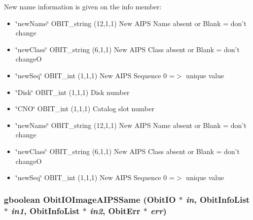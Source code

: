 New name information is given on the info member: \begin{itemize}
\item \char`\"{}new\-Name\char`\"{} OBIT\_\-string (12,1,1) New AIPS Name absent or Blank = don't change \item \char`\"{}new\-Class\char`\"{} OBIT\_\-string (6,1,1) New AIPS Class absent or Blank = don't change\-O \item \char`\"{}new\-Seq\char`\"{} OBIT\_\-int (1,1,1) New AIPS Sequence 0 =$>$ unique value 
\item \char`\"{}Disk\char`\"{} OBIT\_\-int (1,1,1) Disk number \item \char`\"{}CNO\char`\"{} OBIT\_\-int (1,1,1) Catalog slot number \item \char`\"{}new\-Name\char`\"{} OBIT\_\-string (12,1,1) New AIPS Name absent or Blank = don't change \item \char`\"{}new\-Class\char`\"{} OBIT\_\-string (6,1,1) New AIPS Class absent or Blank = don't change\-O \item \char`\"{}new\-Seq\char`\"{} OBIT\_\-int (1,1,1) New AIPS Sequence 0 =$>$ unique value 
\end{itemize}
\subsubsection{\setlength{\rightskip}{0pt plus 5cm}gboolean Obit\-IOImage\-AIPSSame ({\bf Obit\-IO} $\ast$ {\em in}, {\bf Obit\-Info\-List} $\ast$ {\em in1}, {\bf Obit\-Info\-List} $\ast$ {\em in2}, {\bf Obit\-Err} $\ast$ {\em err})}\label{ObitIOImageAIPS_8h_a6}


